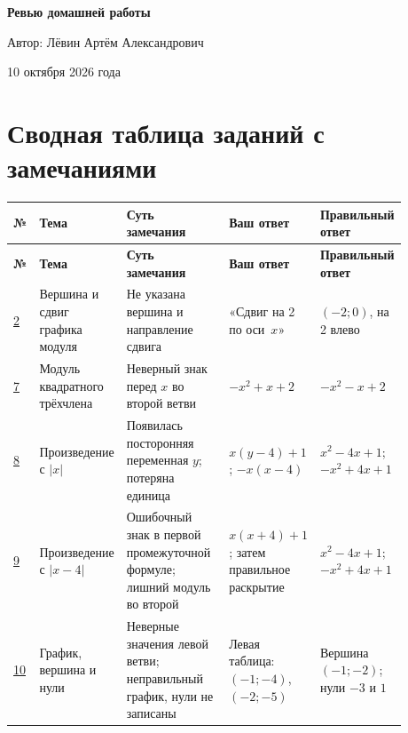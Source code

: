 \documentclass[12pt,a4paper]{article}
\begin{document}
\begin{titlepage}
\centering
\vspace*{0.30\textheight}
{\Huge\bfseries Ревью домашней работы\par}
\vspace{2cm}
{\Large Автор: Лёвин Артём Александрович\par}
\vspace{0.6cm}
{\large 10 октября 2026 года\par}
\vfill
{}
\vspace*{1cm}
\end{titlepage}

\section*{Сводная таблица заданий с замечаниями}
\small
\setlength{\tabcolsep}{3.5pt}
\begin{longtable}{>{\centering\arraybackslash}p{0.065\linewidth} >{\raggedright\arraybackslash}p{0.19\linewidth} >{\raggedright\arraybackslash}p{0.27\linewidth} >{\raggedright\arraybackslash}p{0.18\linewidth} >{\raggedright\arraybackslash}p{0.18\linewidth}}
\toprule
\textbf{№} & \textbf{Тема} & \textbf{Суть замечания} & \textbf{Ваш ответ} & \textbf{Правильный ответ}\\
\midrule
\endfirsthead
\toprule
\textbf{№} & \textbf{Тема} & \textbf{Суть замечания} & \textbf{Ваш ответ} & \textbf{Правильный ответ}\\
\midrule
\endhead
\hyperref[task:2]{2} & Вершина и сдвиг графика модуля & Не указана вершина и направление сдвига & «Сдвиг на 2 по оси~$x$» & $(-2;0)$, на 2 влево\\
\hyperref[task:7]{7} & Модуль квадратного трёхчлена & Неверный знак перед $x$ во второй ветви & $-x^2+x+2$ & $-x^2-x+2$\\
\hyperref[task:8]{8} & Произведение с $|x|$ & Появилась посторонняя переменная $y$; потеряна единица & $x(y-4)+1$; $-x(x-4)$ & $x^2-4x+1$; $-x^2+4x+1$\\
\hyperref[task:9]{9} & Произведение с $|x-4|$ & Ошибочный знак в первой промежуточной формуле; лишний модуль во второй & $x(x+4)+1$; затем правильное раскрытие & $x^2-4x+1$; $-x^2+4x+1$\\
\hyperref[task:10]{10} & График, вершина и нули & Неверные значения левой ветви; неправильный график, нули не записаны & Левая таблица: $(-1;-4)$, $(-2;-5)$ & Вершина $(-1;-2)$; нули $-3$ и $1$\\
\bottomrule
\end{longtable}
\setlength{\tabcolsep}{6pt}
\normalsize
\end{document}
